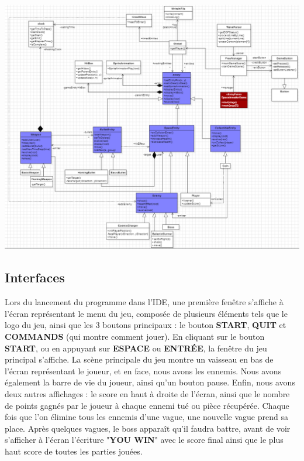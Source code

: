 \documentclass[12pt]{article}
\begin{document}
{\includegraphics[width=1\textwidth]{images/diagramme.png}
\newline \newline \newline \newline \newline \newline \newline \newline

\subsection{Interfaces}

Lors du lancement du programme dans l'IDE, une première fenêtre s'affiche à l'écran représentant le menu du jeu, composée de plusieurs éléments tels que le logo du jeu, ainsi que les 3 boutons principaux : le bouton \textbf{START}, \textbf{QUIT} et \textbf{COMMANDS} (qui montre comment jouer). En cliquant sur le bouton \textbf{START}, ou en appuyant sur \textbf{ESPACE} ou \textbf{ENTRÉE}, la fenêtre du jeu principal s'affiche. La scène principale du jeu montre un vaisseau en bas de l'écran représentant le joueur, et en face, nous avons les ennemis. Nous avons également la barre de vie du joueur, ainsi qu'un bouton pause. Enfin, nous avons deux autres affichages : le score en haut à droite de l'écran, ainsi que le nombre de points gagnés par le joueur à chaque ennemi tué ou pièce récupérée. Chaque fois que l'on élimine tous les ennemis d'une vague, une nouvelle vague prend sa place. Après quelques vagues, le boss apparaît qu'il faudra battre, avant de voir s'afficher à l'écran l'écriture "\textbf{YOU WIN}" avec le score final ainsi que le plus haut score de toutes les parties jouées.

}
\end{document}
